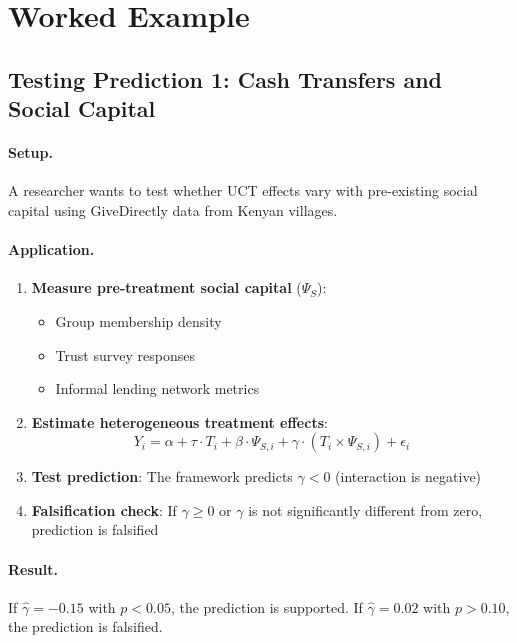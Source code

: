 \section{Worked Example}
\label{sec:S-example}

\subsection{Testing Prediction 1: Cash Transfers and Social Capital}

\paragraph{Setup.}
A researcher wants to test whether UCT effects vary with pre-existing social capital using GiveDirectly data from Kenyan villages.

\paragraph{Application.}
\begin{enumerate}
\item \textbf{Measure pre-treatment social capital} ($\Psi_S$):
    \begin{itemize}
    \item Group membership density
    \item Trust survey responses
    \item Informal lending network metrics
    \end{itemize}
\item \textbf{Estimate heterogeneous treatment effects}:
    \begin{equation}
    Y_i = \alpha + \tau \cdot T_i + \beta \cdot \Psi_{S,i} + \gamma \cdot (T_i \times \Psi_{S,i}) + \epsilon_i
    \end{equation}
\item \textbf{Test prediction}: The framework predicts $\gamma < 0$ (interaction is negative)
\item \textbf{Falsification check}: If $\gamma \geq 0$ or $\gamma$ is not significantly different from zero, prediction is falsified
\end{enumerate}

\paragraph{Result.}
If $\hat{\gamma} = -0.15$ with $p < 0.05$, the prediction is supported. If $\hat{\gamma} = 0.02$ with $p > 0.10$, the prediction is falsified.

